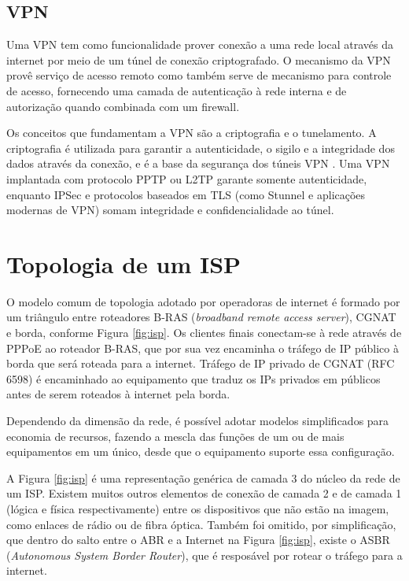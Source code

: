 \subsection{VPN}

    Uma VPN tem como funcionalidade prover conexão a uma rede local através da internet por meio de um túnel de conexão criptografado. O mecanismo da VPN provê serviço de acesso remoto como também serve de mecanismo para controle de acesso, fornecendo uma camada de autenticação à rede interna e de autorização quando combinada com um firewall.
    
    Os conceitos que fundamentam a VPN são a criptografia e o tunelamento. A criptografia é utilizada para garantir a autenticidade, o sigilo e a integridade dos dados através da conexão, e é a base da segurança dos túneis VPN \cite{nakamura2007}. Uma VPN implantada com protocolo PPTP ou L2TP garante somente autenticidade, enquanto IPSec e protocolos baseados em TLS (como Stunnel e aplicações modernas de VPN) somam integridade e confidencialidade ao túnel.

\section{Topologia de um ISP}

    O modelo comum de topologia adotado por operadoras de internet é formado por um triângulo entre roteadores B-RAS (\textit{broadband remote access server}), CGNAT e borda, conforme Figura \ref{fig:isp}. Os clientes finais conectam-se à rede através de PPPoE ao roteador B-RAS, que por sua vez encaminha o tráfego de IP público à borda que será roteada para a internet. Tráfego de IP privado de CGNAT (RFC 6598) é encaminhado ao equipamento que traduz os IPs privados em públicos antes de serem roteados à internet pela borda.
    
    Dependendo da dimensão da rede, é possível adotar modelos simplificados para economia de recursos, fazendo a mescla das funções de um ou de mais equipamentos em um único, desde que o equipamento suporte essa configuração.
    
    A Figura \ref{fig:isp} é uma representação genérica de camada 3 do núcleo da rede de um ISP. Existem muitos outros elementos de conexão de camada 2 e de camada 1 (lógica e física respectivamente) entre os dispositivos que não estão na imagem, como enlaces de rádio ou de fibra óptica. Também foi omitido, por simplificação, que dentro do salto entre o ABR e a Internet na Figura \ref{fig:isp}, existe o ASBR (\textit{Autonomous System Border Router}), que é resposável por rotear o tráfego para a internet.
    
